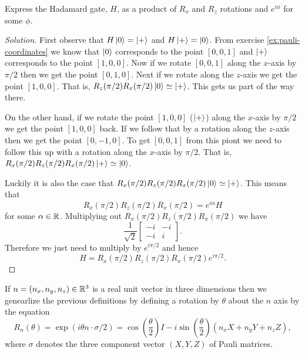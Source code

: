 \documentclass{article}
\begin{document}
\begin{exercise}
  Express the Hadamard gate, $H$, as a product of $R_x$ and $R_z$ rotations and $e^{i\phi}$ for some $\phi$.
  \begin{proof}[Solution]
    First observe that $H\ket{0}=\ket{+}$ and $H\ket{+}=\ket{0}$. From exercise \ref{ex:pauli-coordinates} we know that $\ket{0}$ corresponds to the point $[0,0,1]$ and $\ket{+}$ corresponds to the point $[1,0,0]$. Now if we rotate $[0,0,1]$ along the $x$-axis by $\pi/2$ then we get the point $[0,1,0]$. Next if we rotate along the $z$-axis we get the point $[1,0,0]$. That is, $R_z(\pi/2)R_x(\pi/2)\ket{0}\simeq \ket{+}$. This gets us part of the way there.

    On the other hand, if we rotate the point $[1,0,0]$ ($\ket{+}$) along the $x$-axis by $\pi/2$ we get the point $[1,0,0]$ back. If we follow that by a rotation along the $z$-axis then we get the point $[0,-1,0]$. To get $[0,0,1]$ from this piont we need to follow this up with a rotation along the $x$-axis by $\pi/2$. That is, $R_x(\pi/2)R_z(\pi/2)R_x(\pi/2)\ket{+}\simeq \ket{0}$.

    Luckily it is also the case that $R_x(\pi/2)R_z(\pi/2)R_x(\pi/2)\ket{0}\simeq \ket{+}$. This means that
    \[R_x(\pi/2)R_z(\pi/2)R_x(\pi/2)= e^{i\alpha}H\]
    for some $\alpha\in\mathbb{R}$. Multiplying out $R_x(\pi/2)R_z(\pi/2)R_x(\pi/2)$ we have
    \[
      \frac{1}{\sqrt2}\begin{bmatrix}
        -i&-i \\
        -i&i
      \end{bmatrix}.
    \]
    Therefore we just need to multiply by $e^{i\pi/2}$ and hence
    \[
      H=R_x(\pi/2)R_z(\pi/2)R_x(\pi/2)e^{i\pi/2}.
    \]

  \end{proof}
\end{exercise}

If $n=(n_x, n_y, n_z)\in\mathbb{R}^3$ is a real unit vector in three dimensions then we genearlize the previous definitions by defining a rotation by $\theta$ about the $n$ axis by the equation
\begin{equation}
  R_n(\theta) = \exp(i\theta n\cdot\sigma/2)
  =\cos\left(\frac{\theta}{2}\right)I
  -i\sin\left(\frac{\theta}{2}\right)(n_xX+n_yY+n_zZ),\label{eq:rn}
\end{equation}
where $\sigma$ denotes the three component vector $(X,Y,Z)$ of Pauli matrices.
\end{document}
